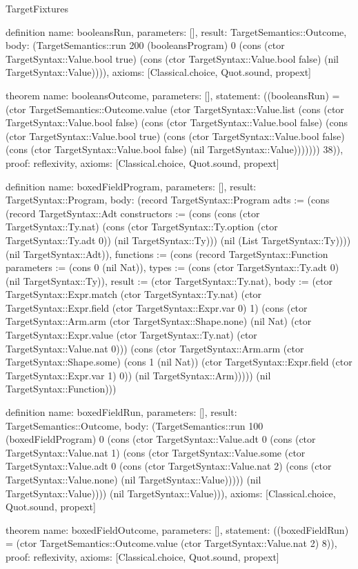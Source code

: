 \begin{lexlean}{TargetFixtures}
\begin{semanticmodule}
definition{
  name: booleansRun,
  parameters: [],
  result: TargetSemantics::Outcome,
  body: (TargetSemantics::run 200 (booleansProgram) 0 (cons (ctor TargetSyntax::Value.bool true) (cons (ctor TargetSyntax::Value.bool false) (nil TargetSyntax::Value)))),
  axioms: [Classical.choice, Quot.sound, propext]
}

theorem{
  name: booleansOutcome,
  parameters: [],
  statement: ((booleansRun) = (ctor TargetSemantics::Outcome.value (ctor TargetSyntax::Value.list (cons (ctor TargetSyntax::Value.bool false) (cons (ctor TargetSyntax::Value.bool false) (cons (ctor TargetSyntax::Value.bool true) (cons (ctor TargetSyntax::Value.bool false) (cons (ctor TargetSyntax::Value.bool false) (nil TargetSyntax::Value))))))) 38)),
  proof: reflexivity{},
  axioms: [Classical.choice, Quot.sound, propext]
}

definition{
  name: boxedFieldProgram,
  parameters: [],
  result: TargetSyntax::Program,
  body: (record TargetSyntax::Program {adts := (cons (record TargetSyntax::Adt {constructors := (cons (cons (ctor TargetSyntax::Ty.nat) (cons (ctor TargetSyntax::Ty.option (ctor TargetSyntax::Ty.adt 0)) (nil TargetSyntax::Ty))) (nil (List TargetSyntax::Ty)))}) (nil TargetSyntax::Adt)), functions := (cons (record TargetSyntax::Function {parameters := (cons 0 (nil Nat)), types := (cons (ctor TargetSyntax::Ty.adt 0) (nil TargetSyntax::Ty)), result := (ctor TargetSyntax::Ty.nat), body := (ctor TargetSyntax::Expr.match (ctor TargetSyntax::Ty.nat) (ctor TargetSyntax::Expr.field (ctor TargetSyntax::Expr.var 0) 1) (cons (ctor TargetSyntax::Arm.arm (ctor TargetSyntax::Shape.none) (nil Nat) (ctor TargetSyntax::Expr.value (ctor TargetSyntax::Ty.nat) (ctor TargetSyntax::Value.nat 0))) (cons (ctor TargetSyntax::Arm.arm (ctor TargetSyntax::Shape.some) (cons 1 (nil Nat)) (ctor TargetSyntax::Expr.field (ctor TargetSyntax::Expr.var 1) 0)) (nil TargetSyntax::Arm))))}) (nil TargetSyntax::Function))})
}

definition{
  name: boxedFieldRun,
  parameters: [],
  result: TargetSemantics::Outcome,
  body: (TargetSemantics::run 100 (boxedFieldProgram) 0 (cons (ctor TargetSyntax::Value.adt 0 (cons (ctor TargetSyntax::Value.nat 1) (cons (ctor TargetSyntax::Value.some (ctor TargetSyntax::Value.adt 0 (cons (ctor TargetSyntax::Value.nat 2) (cons (ctor TargetSyntax::Value.none) (nil TargetSyntax::Value))))) (nil TargetSyntax::Value)))) (nil TargetSyntax::Value))),
  axioms: [Classical.choice, Quot.sound, propext]
}

theorem{
  name: boxedFieldOutcome,
  parameters: [],
  statement: ((boxedFieldRun) = (ctor TargetSemantics::Outcome.value (ctor TargetSyntax::Value.nat 2) 8)),
  proof: reflexivity{},
  axioms: [Classical.choice, Quot.sound, propext]
}


\end{semanticmodule}
\end{lexlean}
